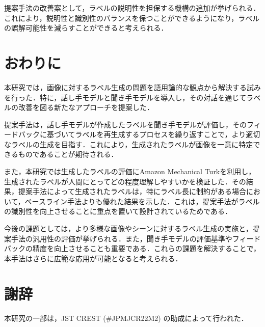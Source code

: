 \documentclass[a4paper,11pt]{jreport}
\begin{document}
提案手法の改善案として，ラベルの説明性を担保する機構の追加が挙げられる．これにより，説明性と識別性のバランスを保つことができるようになり，ラベルの誤解可能性を減らすことができると考えられる．

\chapter{おわりに}

本研究では，画像に対するラベル生成の問題を語用論的な観点から解決する試みを行った．特に，話し手モデルと聞き手モデルを導入し，その対話を通じてラベルの改善を図る新たなアプローチを提案した．

提案手法は，話し手モデルが作成したラベルを聞き手モデルが評価し，そのフィードバックに基づいてラベルを再生成するプロセスを繰り返すことで，より適切なラベルの生成を目指す．これにより，生成されたラベルが画像を一意に特定できるものであることが期待される．

また，本研究では生成したラベルの評価にAmazon Mechanical Turkを利用し，生成されたラベルが人間にとってどの程度理解しやすいかを検証した．その結果，提案手法によって生成されたラベルは，特にラベル長に制約がある場合において，ベースライン手法よりも優れた結果を示した．これは，提案手法がラベルの識別性を向上させることに重点を置いて設計されているためである．

今後の課題としては，より多様な画像やシーンに対するラベル生成の実施と，提案手法の汎用性の評価が挙げられる．また，聞き手モデルの評価基準やフィードバックの精度を向上させることも重要である．これらの課題を解決することで，本手法はさらに広範な応用が可能となると考えられる．

\chapter*{謝辞}

本研究の一部は，JST CREST (\#JPMJCR22M2) の助成によって行われた．

\newpage

\renewcommand{\bibname}{参考文献}



\end{document}
